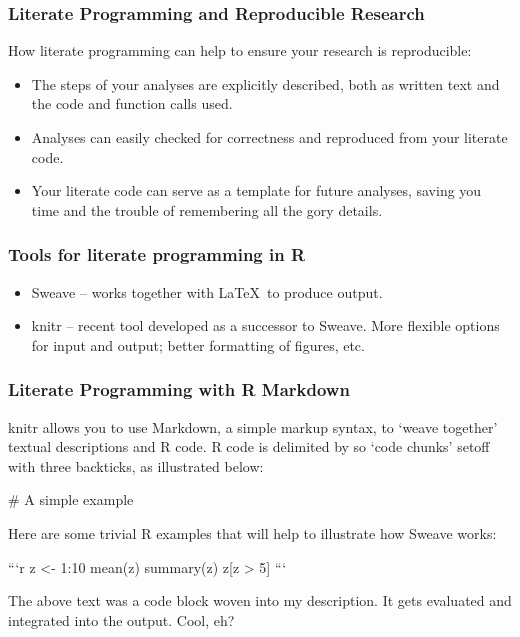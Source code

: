 \documentclass{beamer}
\begin{document}
\begin{frame}
  \frametitle{Literate Programming and Reproducible Research}

How literate programming can help to ensure your research is reproducible:

\begin{itemize}

 \item The steps of your analyses are explicitly described, both as written text and the code and function calls used.
 \item Analyses can easily checked for correctness and reproduced from your literate code.
 \item Your literate code can serve as a template for future analyses, saving you time and the trouble of remembering all the gory details.
\end{itemize}

\end{frame}

\begin{frame}
  \frametitle{Tools for literate programming in R}


\begin{itemize}

 \item Sweave -- works together with \LaTeX\ to produce output.
 \item knitr -- recent tool developed as a successor to Sweave. More flexible options for input and output; better formatting of figures, etc.

\end{itemize}
\end{frame}


\begin{frame}[fragile]
  \frametitle{Literate Programming with R Markdown}

knitr allows you to use Markdown, a simple markup syntax, to `weave together' textual descriptions and R code. R code is delimited by so `code chunks' setoff with three backticks, as illustrated below:

\smallskip

\begin{tcolorbox}
\begin{Rcode}
# A simple example

Here are some trivial R examples that will help to
illustrate how Sweave works:

```{r}
z <- 1:10
mean(z)
summary(z)
z[z > 5]
```

The above text was a code block woven into my
description. It gets evaluated and integrated into
the output. Cool, eh?
\end{Rcode}
\end{tcolorbox}

\end{frame}
\end{document}
